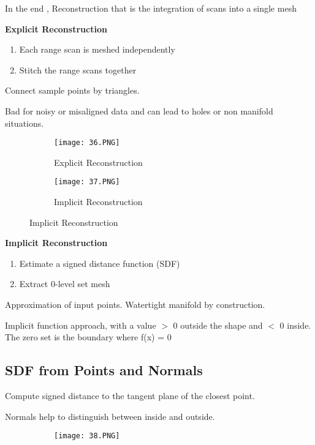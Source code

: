 \documentclass{article}
\begin{document}
In the end , Reconstruction that is the integration of scans into a single mesh

\textbf{Explicit Reconstruction}

\begin{enumerate}
    \item Each range scan is meshed independently 
    \item Stitch the range scans together
\end{enumerate}

Connect sample points by triangles.

Bad for noisy or misaligned data and can lead to holes or non manifold situations.

\begin{figure}[ht!]
  \centering
  \begin{subfigure}[b]{0.5\linewidth}
    \texttt{[image: 36.PNG]}
    \caption{Explicit Reconstruction}
  \end{subfigure}
     \begin{subfigure}[b]{0.49\textwidth}
         \centering
         \texttt{[image: 37.PNG]}
         \caption{Implicit Reconstruction}
     \end{subfigure}
\end{figure}


\textbf{Implicit Reconstruction}

\begin{enumerate}
    \item Estimate a signed distance function (SDF)
    \item Extract 0-level set mesh
\end{enumerate}

Approximation of input points. Watertight manifold by construction.


Implicit function approach, with a value $>$ 0 outside the shape and $<$ 0 inside. The zero set is the boundary where f(x) = 0

\subsection{SDF from Points and Normals}

Compute signed distance to the tangent plane of the closest point.

Normals help to distinguish between inside and outside.

\begin{figure}[ht!]
  \centering
  \begin{subfigure}[b]{0.4\linewidth}
    \texttt{[image: 38.PNG]}
  \end{subfigure}
\end{figure}
\end{document}
